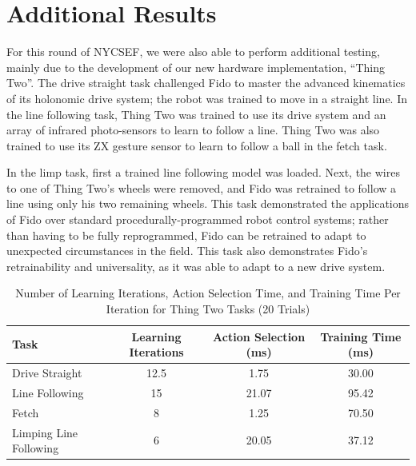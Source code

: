 \documentclass[letterpaper,11pt]{article}
\begin{document}
	\section*{Additional Results}

	For this round of NYCSEF, we were also able to perform additional testing, mainly due to the development of our new hardware implementation, ``Thing Two''.  The drive straight task challenged Fido to master the advanced kinematics of its holonomic drive system; the robot was trained to move in a straight line.  In the line following task, Thing Two was trained to use its drive system and an array of infrared photo-sensors to learn to follow a line.  Thing Two was also trained to use its ZX gesture sensor to learn to follow a ball in the fetch task.   

	In the limp task, first a trained line following model was loaded.  Next, the wires to one of Thing Two's wheels were removed, and Fido was retrained to follow a line using only his two remaining wheels.  This task demonstrated the applications of Fido over standard procedurally-programmed robot control systems; rather than having to be fully reprogrammed, Fido can be retrained to adapt to unexpected circumstances in the field.  This task also demonstrates Fido's retrainability and universality, as it was able to adapt to a new drive system.

	\begin{table}[ht]
		\centering
		\begin{tabular}{@{}lccc@{}}
			\toprule
			Task                   & Learning Iterations & Action Selection (ms) & Training Time (ms) \\ \midrule
			Drive Straight         & 12.5                   & 1.75                    & 30.00                  \\
			Line Following         & 15                  & 21.07                    & 95.42                \\
			Fetch                  & 8                  & 1.25                     & 70.50                 \\
			Limping Line Following & 6                   & 20.05                    & 37.12                 \\ \bottomrule
		\end{tabular}
		\caption{Number of Learning Iterations, Action Selection Time, and Training Time Per Iteration for Thing Two Tasks (20 Trials)}
		\label{tab:data}
	\end{table}
\end{document}
